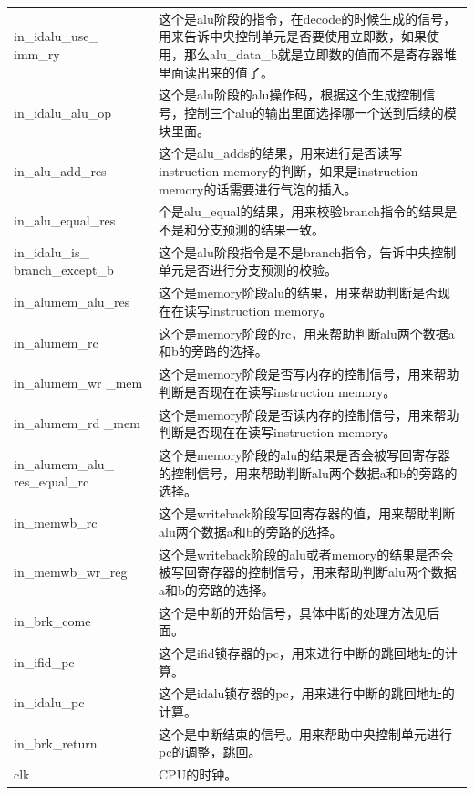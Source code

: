 \begin{center}
\begin{longtable}{p{}p{}}
            in\_idalu\_use\_ imm\_ry & 这个是alu阶段的指令，在decode的时候生成的信号，用来告诉中央控制单元是否要使用立即数，如果使用，那么alu\_data\_b就是立即数的值而不是寄存器堆里面读出来的值了。\\
            in\_idalu\_alu\_op & 这个是alu阶段的alu操作码，根据这个生成控制信号，控制三个alu的输出里面选择哪一个送到后续的模块里面。\\
            in\_alu\_add\_res & 这个是alu\_adds的结果，用来进行是否读写instruction memory的判断，如果是instruction memory的话需要进行气泡的插入。\\
            in\_alu\_equal\_res & 个是alu\_equal的结果，用来校验branch指令的结果是不是和分支预测的结果一致。\\
            in\_idalu\_is\_  branch\_except\_b & 这个是alu阶段指令是不是branch指令，告诉中央控制单元是否进行分支预测的校验。\\
            in\_alumem\_alu\_res & 这个是memory阶段alu的结果，用来帮助判断是否现在在读写instruction memory。\\
            in\_alumem\_rc & 这个是memory阶段的rc，用来帮助判断alu两个数据a和b的旁路的选择。\\
            in\_alumem\_wr  \_mem & 这个是memory阶段是否写内存的控制信号，用来帮助判断是否现在在读写instruction memory。\\
            in\_alumem\_rd  \_mem & 这个是memory阶段是否读内存的控制信号，用来帮助判断是否现在在读写instruction memory。\\
            in\_alumem\_alu\_  res\_equal\_rc & 这个是memory阶段的alu的结果是否会被写回寄存器的控制信号，用来帮助判断alu两个数据a和b的旁路的选择。\\
            in\_memwb\_rc & 这个是writeback阶段写回寄存器的值，用来帮助判断alu两个数据a和b的旁路的选择。\\
            in\_memwb\_wr\_reg & 这个是writeback阶段的alu或者memory的结果是否会被写回寄存器的控制信号，用来帮助判断alu两个数据a和b的旁路的选择。\\
            in\_brk\_come & 这个是中断的开始信号，具体中断的处理方法见后面。\\
            in\_ifid\_pc & 这个是ifid锁存器的pc，用来进行中断的跳回地址的计算。\\
            in\_idalu\_pc & 这个是idalu锁存器的pc，用来进行中断的跳回地址的计算。\\
            in\_brk\_return & 这个是中断结束的信号。用来帮助中央控制单元进行pc的调整，跳回。\\
            clk & CPU的时钟。\\

\end{longtable}
\end{center}
